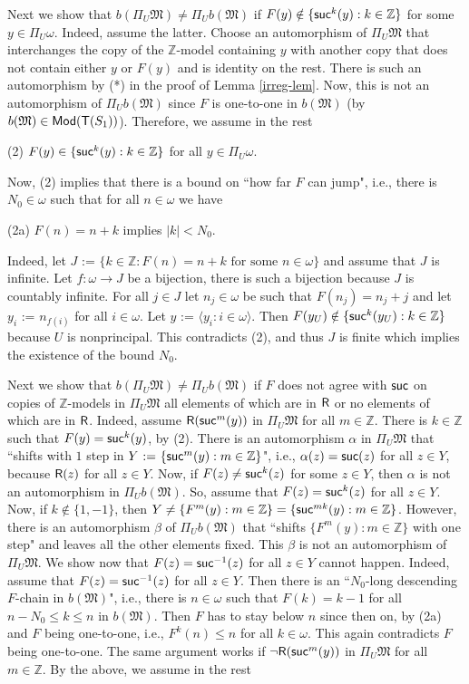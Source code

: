 \documentclass[12pt,leqno]{article}
\newcommand{\de}{\mbox{\ :=\ }}
\newcommand{\Mm}{\mbox{$\mathfrak M$}}
\newcommand{\T}{\mbox{\sf T}}
\newcommand{\Mod}{\mbox{\sf Mod}}
\newcommand{\R}{\mbox{\sf R}}
\newcommand{\Z}{\mathbb Z}
\newcommand{\suc}{\mbox{\sf suc}}
\begin{document}
Next we show that $b(\Pi_U\Mm)\ne\Pi_U b(\Mm)$ if $F(y)\notin \{\suc^k(y) : k\in\Z\}$ for some $y\in\Pi_U\omega$.  Indeed, assume the latter.  Choose an automorphism of $\Pi_U\Mm$ that interchanges the copy of the $\Z$-model containing $y$ with another copy that does not contain either $y$ or $F(y)$ and is identity on the rest. There is such an automorphism by (*) in the proof of Lemma \ref{irreg-lem}. Now, this is not an automorphism of $\Pi_Ub(\Mm)$ since $F$ is one-to-one in $b(\Mm)$ (by $b(\Mm)\in\Mod(\T(S_1))$). Therefore, we assume in the rest
%
\begin{description}\label{2}
	\item{(2)} $F(y)\in \{\suc^k(y) : k\in\Z\}$ for all $y\in\Pi_U\omega$.	
\end{description}
%
Now, (2) implies that there is a bound on ``how far $F$ can jump", i.e., there is $N_0\in\omega$ such that for all $n\in\omega$ we have
\begin{description}\label{2a}
	\item{(2a)} $F(n)=n+k$  implies $|k|<N_0$.	
\end{description}
Indeed, let $J\de\{ k\in\Z : F(n)=n+k\mbox{ for some }n\in\omega\}$ and assume that $J$ is infinite. Let $f:\omega\to J$ be a bijection, there is such a bijection because $J$ is countably infinite. For all $j\in J$ let $n_j\in\omega$ be such that $F(n_j)=n_j+j$ and let $y_i\de n_{f(i)}$ for all $i\in\omega$. Let $y \de\langle y_i : i\in\omega\rangle$. Then $F(y_U)\notin\{\suc^k(y_U) : k\in\Z\}$ because $U$ is nonprincipal. This contradicts (2), and thus $J$ is finite which implies the existence of the bound $N_0$.

Next we show that $b(\Pi_U\Mm)\ne\Pi_U b(\Mm)$ if $F$ does not agree with $\suc$ on copies of $\Z$-models in $\Pi_U\Mm$ all elements of which are in $\R$ or no elements of which are in $\R$.
Indeed, assume $\R(\suc^m(y))$ in $\Pi_U\Mm$ for all $m\in\Z$. %
There is $k\in\Z$ such that $F(y)=\suc^k(y)$, by (2). There is an automorphism $\alpha$ in $\Pi_U\Mm$ that ``shifts with $1$ step in $Y\de\{\suc^m(y) : m\in \Z\}$", i.e., $\alpha(z)=\suc(z)$ for all $z\in Y$, because $\R(z)$ for all $z\in Y$.  Now, if $F(z)\ne\suc^k(z)$ for some $z\in Y$, then $\alpha$ is not an automorphism in $\Pi_Ub(\Mm)$. So, assume that $F(z)=\suc^k(z)$ for all $z\in Y$. Now, if $k\notin\{1,-1\}$, then $Y\ne\{ F^m(y) : m\in\Z\}=\{\suc^{mk}(y) : m\in\Z\}$. However, there is an automorphism  $\beta$ of $\Pi_Ub(\Mm)$ that ``shifts  $\{ F^m(y) : m\in\Z\}$ with one step" and leaves all the other elements fixed. This $\beta$ is not an automorphism of $\Pi_U\Mm$. We show now that $F(z)=\suc^{-1}(z)$ for all $z\in Y$ cannot happen. Indeed, assume that $F(z)=\suc^{-1}(z)$ for all $z\in Y$. Then there is an ``$N_0$-long descending $F$-chain in $b(\Mm)$", i.e., there is $n\in\omega$ such that $F(k)=k-1$ for all $n-N_0\le k\le n$ in $b(\Mm)$. Then $F$ has to stay below $n$ since then on, by (2a) and $F$ being one-to-one, i.e., $F^k(n)\le n$ for all $k\in\omega$.
This again contradicts $F$ being one-to-one.
%
The same argument works if $\lnot\R(\suc^m(y))$ in $\Pi_U\Mm$ for all $m\in\Z$. By the above, we assume in the rest
\end{document}

